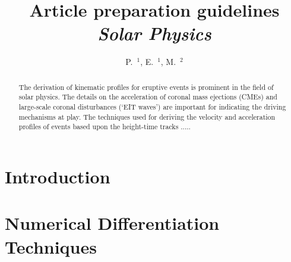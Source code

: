 \documentclass[namedreferences]{SolarPhysics}
\begin{document}
\begin{article}

\begin{opening}

\title{Article preparation guidelines\\ {\it Solar Physics}}

\author{P.~$^{1}$\sep
        E.~$^{1}$\sep
        M.~$^{2}$      
       }


\begin{abstract}
The derivation of kinematic profiles for eruptive events is prominent in the field of solar physics. The details on the acceleration of coronal mass ejections (CMEs) and large-scale coronal disturbances (`EIT waves') are important for indicating the driving mechanisms at play. The techniques used for deriving the velocity and acceleration profiles of events based upon the height-time tracks .....


\end{abstract}
\end{opening}

\section{Introduction}
   

 

\section{Numerical Differentiation Techniques} %
 

\end{article}
\end{document}
